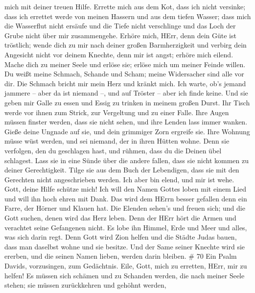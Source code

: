 mich mit deiner treuen Hilfe.  Errette mich aus dem Kot,
dass ich nicht versinke; dass ich errettet werde von meinen Hassern und
aus dem tiefen Wasser;  dass mich die Wasserflut nicht
ersäufe und die Tiefe nicht verschlinge und das Loch der Grube nicht
über mir zusammengehe.  Erhöre mich, HErr, denn dein Güte
ist tröstlich; wende dich zu mir nach deiner großen Barmherzigkeit
 und verbirg dein Angesicht nicht vor deinem Knechte, denn
mir ist angst; erhöre mich eilend.  Mache dich zu meiner
Seele und erlöse sie; erlöse mich um meiner Feinde willen. 
Du weißt meine Schmach, Schande und Scham; meine Widersacher sind alle
vor dir.  Die Schmach bricht mir mein Herz und kränkt mich.
Ich warte, ob's jemand jammere -- aber da ist niemand --, und auf
Tröster -- aber ich finde keine.  Und sie geben mir Galle
zu essen und Essig zu trinken in meinem großen Durst.  Ihr
Tisch werde vor ihnen zum Strick, zur Vergeltung und zu einer Falle.
 Ihre Augen müssen finster werden, dass sie nicht sehen,
und ihre Lenden lass immer wanken.  Gieße deine Ungnade auf
sie, und dein grimmiger Zorn ergreife sie.  Ihre Wohnung
müsse wüst werden, und sei niemand, der in ihren Hütten wohne.
 Denn sie verfolgen, den du geschlagen hast, und rühmen,
dass du die Deinen übel schlagest.  Lass sie in eine Sünde
über die andere fallen, dass sie nicht kommen zu deiner Gerechtigkeit.
 Tilge sie aus dem Buch der Lebendigen, dass sie mit den
Gerechten nicht angeschrieben werden.  Ich aber bin elend,
und mir ist wehe. Gott, deine Hilfe schütze mich!  Ich will
den Namen Gottes loben mit einem Lied und will ihn hoch ehren mit Dank.
 Das wird dem HErrn besser gefallen denn ein Farre, der
Hörner und Klauen hat.  Die Elenden sehen's und freuen
sich; und die Gott suchen, denen wird das Herz leben.  Denn
der HErr hört die Armen und verachtet seine Gefangenen nicht.
 Es lobe ihn Himmel, Erde und Meer und alles, was sich
darin regt.  Denn Gott wird Zion helfen und die Städte
Judas bauen, dass man daselbst wohne und sie besitze.  Und
der Same seiner Knechte wird sie ererben, und die seinen Namen lieben,
werden darin bleiben. \# 70  Ein Psalm Davids, vorzusingen,
zum Gedächtnis.  Eile, Gott, mich zu erretten, HErr, mir zu
helfen!  Es müssen sich schämen und zu Schanden werden, die
nach meiner Seele stehen; sie müssen zurückkehren und gehöhnt werden,
